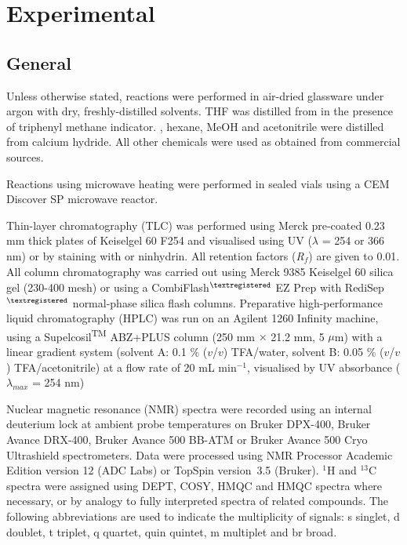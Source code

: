 \newpage

\section{Experimental}

\subsection{General}

Unless otherwise stated, reactions were performed in air-dried glassware under argon with dry, freshly-distilled solvents. THF was distilled from  in the presence of triphenyl methane indicator. , hexane, MeOH and acetonitrile were distilled from calcium hydride. All other chemicals were used as obtained from commercial sources.

Reactions using microwave heating were performed in sealed vials using a CEM Discover SP microwave reactor. 

Thin-layer chromatography (TLC) was performed using Merck pre-coated 0.23 mm thick plates of Keiselgel 60 F254 and visualised using UV ($\lambda$ = 254 or 366 nm) or by staining with  or ninhydrin. 
All retention factors (\textit{R}$_\textit{f}$) are given to 0.01. 
All column chromatography was carried out using Merck 9385 Keiselgel 60 silica gel (230-400 mesh) or using a CombiFlash$^{\tiny{\textregistered}}$ EZ Prep with RediSep$^{\tiny{\textregistered}}$ normal-phase silica flash columns. 
Preparative high-performance liquid chromatography (HPLC) was run on an Agilent 1260 Infinity machine, using a Supelcosil\textsuperscript{TM} ABZ+PLUS column (250 mm $\times$ 21.2 mm, 5 $\mu$m) with a linear gradient system (solvent A: 0.1 \% ($v$/$v$) TFA/water, solvent B: 0.05 \% ($v$/$v$) TFA/acetonitrile) at a flow rate of 20 mL min$^{-1}$, visualised by UV absorbance ($\lambda_{max}$ = 254 nm)

Nuclear magnetic resonance (NMR) spectra were recorded using an internal deuterium lock at ambient probe temperatures on Bruker DPX-400, Bruker Avance DRX-400, Bruker Avance 500 BB-ATM or Bruker Avance 500 Cryo Ultrashield spectrometers. Data were processed using NMR Processor Academic Edition version 12 (ADC Labs) or TopSpin version 3.5 (Bruker). $^1$H and $^13$C spectra were assigned using DEPT, COSY, HMQC and HMQC spectra where necessary, or by analogy to fully interpreted spectra of related compounds. The following abbreviations are used to indicate the multiplicity of signals: s singlet, d doublet, t triplet, q quartet, quin quintet, m multiplet and br broad.

